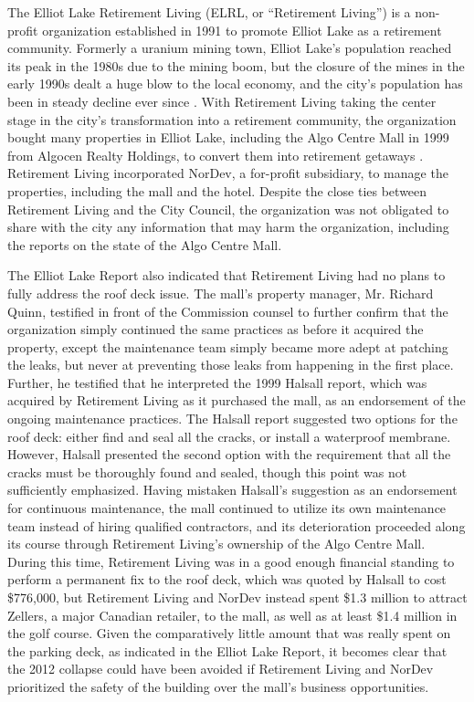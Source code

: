 \documentclass[12pt]{article}
\begin{document}
The Elliot Lake Retirement Living (ELRL, or ``Retirement Living'') is a non-profit organization established in 1991 to promote Elliot Lake as a retirement community. Formerly a uranium mining town, Elliot Lake's population reached its peak in the 1980s due to the mining boom, but the closure of the mines in the early 1990s dealt a huge blow to the local economy, and the city's population has been in steady decline ever since \cite{ElliotLakePopulation}. With Retirement Living taking the center stage in the city's transformation into a retirement community, the organization bought many properties in Elliot Lake, including the Algo Centre Mall in 1999 from Algocen Realty Holdings, to convert them into retirement getaways \cite{NYT1996}. Retirement Living incorporated NorDev, a for-profit subsidiary, to manage the properties, including the mall and the hotel. Despite the close ties between Retirement Living and the City Council, the organization was not obligated to share with the city any information that may harm the organization, including the reports on the state of the Algo Centre Mall. 

The Elliot Lake Report also indicated that Retirement Living had no plans to fully address the roof deck issue. The mall's property manager, Mr. Richard Quinn, testified in front of the Commission counsel to further confirm that the organization simply continued the same practices as before it acquired the property, except the maintenance team simply became more adept at patching the leaks, but never at preventing those leaks from happening in the first place. Further, he testified that he interpreted the 1999 Halsall report, which was acquired by Retirement Living as it purchased the mall, as an endorsement of the ongoing maintenance practices. The Halsall report suggested two options for the roof deck: either find and seal all the cracks, or install a waterproof membrane. However, Halsall presented the second option with the requirement that all the cracks must be thoroughly found and sealed, though this point was not sufficiently emphasized. Having mistaken Halsall's suggestion as an endorsement for continuous maintenance, the mall continued to utilize its own maintenance team instead of hiring qualified contractors, and its deterioration proceeded along its course through Retirement Living's ownership of the Algo Centre Mall. During this time, Retirement Living was in a good enough financial standing to perform a permanent fix to the roof deck, which was quoted by Halsall to cost \$776,000, but Retirement Living and NorDev instead spent \$1.3 million to attract Zellers, a major Canadian retailer, to the mall, as well as at least \$1.4 million in the golf course. Given the comparatively little amount that was really spent on the parking deck, as indicated in the Elliot Lake Report, it becomes clear that the 2012 collapse could have been avoided if Retirement Living and NorDev prioritized the safety of the building over the mall's business opportunities.
\end{document}
